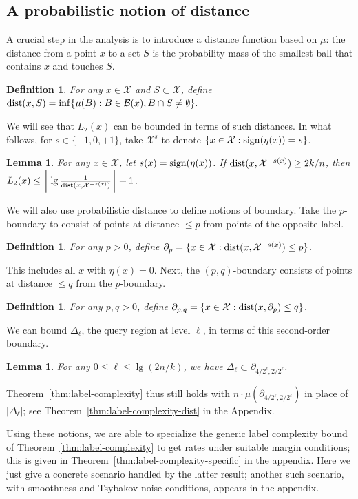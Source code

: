 \documentclass[twoside]{article}
\def\X{{\mathcal X}}
\def\B{{\mathcal B}}
\def\dist{{\rm dist}}
\def\sign{{\rm sign}}
\newtheorem{lemma}[thm]{Lemma}
\newtheorem{defn}[thm]{Definition}
\begin{document}
\subsection{A probabilistic notion of distance}

A crucial step in the analysis is to introduce a distance function based on $\mu$: the distance from a point $x$ to a set $S$ is the probability mass of the smallest ball that contains $x$ and touches $S$.
\begin{defn}
For any $x \in \X$ and $S \subset \X$, define
$\dist(x,S) = \inf \{\mu(B): B \in \B(x), B \cap S \neq \emptyset\} .$
\label{defn:prob-dist}
\end{defn}
We will see that $L_2(x)$ can be bounded in terms of such distances. In what follows, for $s \in \{-1,0,+1\}$, take $\X^s$ to denote $\{x \in \X: \sign(\eta(x)) = s\}$.
\begin{lemma}
For any $x \in \X$, let $s(x) = \sign(\eta(x))$. If $\dist(x, \X^{-s(x)}) \geq 2k/n$, then
$L_2(x) \leq \bigg\lceil \lg \frac{1}{\dist(x, \X^{-s(x)})} \bigg\rceil + 1$.
\label{lemma:L2-bound}
\end{lemma}
We will also use probabilistic distance to define notions of boundary. Take the $p$-boundary to consist of points at distance $\leq p$ from points of the opposite label.
\begin{defn}
For any $p > 0$, define $\partial_p = \{x \in \X: \dist(x, \X^{-s(x)}) \leq p\}$.
\label{defn:boundary}
\end{defn}
This includes all $x$ with $\eta(x) = 0$. Next, the $(p,q)$-boundary consists of points at distance $\leq q$ from the $p$-boundary.
\begin{defn}
For any $p,q > 0$, define $\partial_{p,q} = \{x \in \X: \dist(x, \partial_p) \leq q\}$.
\label{defn:boundary2}
\end{defn}

We can bound $\Delta_\ell$, the query region at level $\ell$, in terms of this second-order boundary.
\begin{lemma}
For any $0 \leq \ell \leq \lg (2n/k)$, we have $\Delta_\ell \subset \partial_{4/2^\ell, 2/2^\ell}$.
\label{lemma:delta-continuous}
\end{lemma}
Theorem~\ref{thm:label-complexity} thus still holds with $n \cdot \mu(\partial_{4/2^\ell, 2/2^\ell})$ in place of $|\Delta_\ell|$; see Theorem~\ref{thm:label-complexity-dist} in the Appendix. 

Using these notions, we are able to specialize the generic label complexity bound of Theorem~\ref{thm:label-complexity} to get rates under suitable margin conditions; this is given in Theorem~\ref{thm:label-complexity-specific} in the appendix. Here we just give a concrete scenario handled by the latter result; another such scenario, with smoothness and Tsybakov noise conditions, appears in the appendix.
\end{document}
